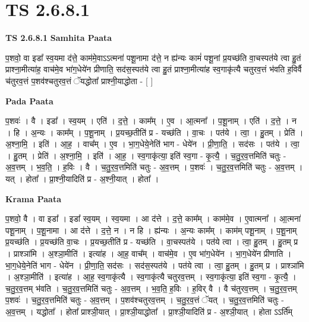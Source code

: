 \documentclass[17pt]{extarticle}
\begin{document}
\section{ TS 2.6.8.1 }

\textbf{TS 2.6.8.1 } \newline
\textbf{Samhita Paata} \newline

प॒शवो॒ वा इडा᳚ स्व॒यमा द॑त्ते॒ काम॑मे॒वाऽऽत्मना॑ पशू॒नामा द॑त्ते॒ न ह्य॑न्यः कामं॑ पशू॒नां प्र॒यच्छ॑ति वा॒चस्पत॑ये त्वा हु॒तं प्राश्ना॒मीत्या॑ह॒ वाच॑मे॒व भा॑ग॒धेये॑न प्रीणाति॒ सद॑स॒स्पत॑ये त्वा हु॒तं प्राश्ना॒मीत्या॑ह स्व॒गाकृ॑त्यै चतुरव॒त्तं भ॑वति ह॒विर्वै च॑तुरव॒त्तं प॒शव॑श्चतुरव॒त्तं ॅयद्धोता᳚ प्राश्नी॒याद्धोता - [  ] \newline

\textbf{Pada Paata} \newline

प॒शवः॑ । वै । इडा᳚ । स्व॒यम् । एति॑ । द॒त्ते॒ । काम᳚म् । ए॒व । आ॒त्मना᳚ । प॒शू॒नाम् । एति॑ । द॒त्ते॒ । न । हि । अ॒न्यः । काम᳚म् । प॒शू॒नाम् । प्र॒यच्छ॒तीति॑ प्र - यच्छ॑ति । वा॒चः । पत॑ये । त्वा॒ । हु॒तम् । प्रेति॑ । अ॒श्ना॒मि॒ । इति॑ । आ॒ह॒ । वाच᳚म् । ए॒व । भा॒ग॒धेये॒नेति॑ भाग - धेये॑न । प्री॒णा॒ति॒ । सद॑सः । पत॑ये । त्वा॒ । हु॒तम् । प्रेति॑ । अ॒श्ना॒मि॒ । इति॑ । आ॒ह॒ । स्व॒गाकृ॑त्या॒ इति॑ स्व॒गा - कृ॒त्यै॒ । च॒तु॒र॒व॒त्तमिति॑ चतुः - अ॒व॒त्तम् । भ॒व॒ति॒ । ह॒विः । वै । च॒तु॒र॒व॒त्तमिति॑ चतुः - अ॒व॒त्तम् । प॒शवः॑ । च॒तु॒र॒व॒त्तमिति॑ चतुः - अ॒व॒त्तम् । यत् । होता᳚ । प्रा॒श्नी॒यादिति॑ प्र - अ॒श्नी॒यात् । होता᳚ ।  \newline


\textbf{Krama Paata} \newline

प॒शवो॒ वै । वा इडा᳚ । इडा᳚ स्व॒यम् । स्व॒यमा । आ द॑त्ते । द॒त्ते॒ काम᳚म् । काम॑मे॒व । ए॒वात्मना᳚ । आ॒त्मना॑ पशू॒नाम् । प॒शू॒नामा । आ द॑त्ते । द॒त्ते॒ न । न हि । ह्य॑न्यः । अ॒न्यः काम᳚म् । काम॑म् पशू॒नाम् । प॒शू॒नाम् प्र॒यच्छ॑ति । प्र॒यच्छ॑ति वा॒चः । प्र॒यच्छ॒तीति॑ प्र - यच्छ॑ति । वा॒चस्पत॑ये । पत॑ये त्वा । त्वा॒ हु॒तम् । हु॒तम् प्र । प्राश्ञा॑मि । अ॒श्ञा॒मीति॑ । इत्या॑ह । आ॒ह॒ वाच᳚म् । वाच॑मे॒व । ए॒व भा॑ग॒धेये॑न । भा॒ग॒धेये॑न प्रीणाति । भा॒ग॒धेये॒नेति॑ भाग - धेये॑न । प्री॒णा॒ति॒ सद॑सः । सद॑स॒स्पत॑ये । पत॑ये त्वा । त्वा॒ हु॒तम् । हु॒तम् प्र । प्राश्ञा॑मि । अ॒श्ञा॒मीति॑ । इत्या॑ह । आ॒ह॒ स्व॒गाकृ॑त्यै । स्व॒गाकृ॑त्यै चतुरव॒त्तम् । स्व॒गाकृ॑त्या॒ इति॑ स्व॒गा - कृ॒त्यै॒ । च॒तु॒र॒व॒त्तम् भ॑वति । च॒तु॒र॒व॒त्तमिति॑ चतुः - अ॒व॒त्तम् । भ॒व॒ति॒ ह॒विः । ह॒विर् वै । वै च॑तुरव॒त्तम् । च॒तु॒र॒व॒त्तम् प॒शवः॑ । च॒तु॒र॒व॒त्तमिति॑ चतुः - अ॒व॒त्तम् । प॒शव॑श्चतुरव॒त्तम् । च॒तु॒र॒व॒त्तं ॅयत् । च॒तु॒र॒व॒त्तमिति॑ चतुः - अ॒व॒त्तम् । यद्धोता᳚ । होता᳚ प्राश्ञी॒यात् । प्रा॒श्ञी॒याद्धोता᳚ । प्रा॒श्ञी॒यादिति॑ प्र - अ॒श्ञी॒यात् । होता ऽऽर्ति᳚म् \newline
\end{document}

